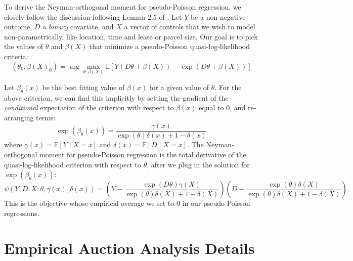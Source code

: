 \begin{appendices}
To derive the Neyman-orthogonal moment for pseudo-Poisson regression, we closely follow the discussion following Lemma 2.5 of \cite{chernozhukov2018double}.  Let $Y$ be a non-negative outcome, $D$ a \textit{binary} covariate, and $X$ a vector of controls that we wish to model non-parametrically, like location, time and lease or parcel size.  Our goal is to pick the values of $\theta$ and $\beta(X)$ that minimize a pseudo-Poisson quasi-log-likelihood criteria:
\begin{equation*}
	(\theta_0, \beta(X)_0) = \arg \max_{\theta, \beta(X)} \mathbb{E}\left[Y(D\theta + \beta(X))-\exp(D\theta + \beta(X))\right]
\end{equation*}

Let $\beta_{\theta}(x)$ be the best fitting value of $\beta(x)$ for a given value of $\theta$.  For the above criterion, we can find this implicitly by setting the gradient of the \textit{conditional} expectation of the criterion with respect to $\beta(x)$ equal to 0, and re-arranging terms:
\begin{equation*}
	\exp(\beta_{\theta}(x)) = \frac{\gamma(x)}{\exp(\theta)\delta(x) + 1 - \delta(x)}
\end{equation*}	
where $\gamma(x) = \mathbb{E}\left[Y\mid X = x\right]$ and $\delta(x) = \mathbb{E}\left[D\mid X = x\right]$.  The Neyman-orthogonal moment for pseudo-Poisson regression is the total derivative of the quasi-log-likelihood criterion with respect to $\theta$, after we plug in the solution for $\exp(\beta_{\theta}(x))$:
\begin{equation*}
	\psi(Y, D, X; \theta, \gamma(x), \delta(x)) = \left(Y-\frac{\exp(D\theta)\gamma(X)}{\exp(\theta)\delta(X) + 1 - \delta(X)}\right)\left(D - \frac{\exp(\theta)\delta(X)}{\exp(\theta)\delta(X) + 1 - \delta(X)}\right).
\end{equation*}
This is the objective whose empirical average we set to 0 in our pseudo-Poisson regressions.

\section{Empirical Auction Analysis Details}\label{sec:AppendixAuction}


\end{appendices}
